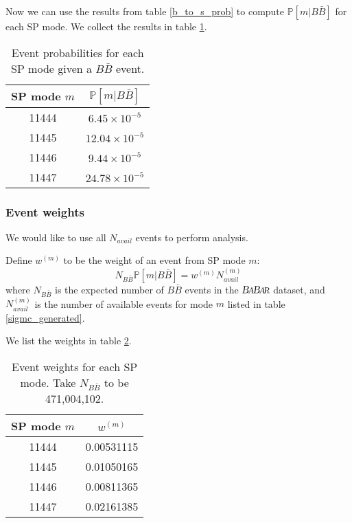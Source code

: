 \documentclass{article}
\newcommand{\CondP}[2]{\ensuremath{\mathbb{P}\left[#1|#2\right]}}
\renewcommand{\(}{\left(}
\renewcommand{\)}{\right)}
\numberwithin{equation}{section}
\begin{document}
Now we can use the results from table \ref{b_to_s_prob} to compute $\CondP{m}{B\bar{B}}$ for each SP mode. We collect the results in table \ref{spmode_prob}. 
\begin{table}[H]
  \begin{center}
    \begin{tabular}{ c c }
      SP mode $m$ & $\CondP{m}{B\bar{B}}$ \\
      \hline\hline
      11444 & $6.45\times 10^{-5}$ \\
      \hline
      11445 & $12.04\times 10^{-5}$ \\
      \hline
      11446 & $9.44\times 10^{-5}$ \\
      \hline
      11447 & $24.78\times 10^{-5}$ \\
      \hline
    \end{tabular}
  \end{center}
  \caption{Event probabilities for each SP mode given a $B\bar{B}$ event.}
  \label{spmode_prob}
\end{table}

\subsubsection{Event weights}
We would like to use all $N_{avail}$ events to perform analysis. 

Define $w^{(m)}$ to be the weight of an event from SP mode $m$:
\begin{equation}
  N_{B\bar{B}}\CondP{m}{B\bar{B}}=w^{(m)} N^{(m)}_{avail}
\end{equation}
where $N_{B\bar{B}}$ is the expected number of $B\bar{B}$ events in the $\babar$ dataset, and $N^{(m)}_{avail}$ is the number of available events for mode $m$ listed in table \ref{sigmc_generated}. 

We list the weights in table \ref{sigmc_weights}.
\begin{table}[H]
  \begin{center}
    \begin{tabular}{ c c }
      SP mode $m$ & $w^{(m)}$ \\
      \hline\hline
      11444 & 0.00531115 \\ 
      \hline
      11445 & 0.01050165 \\
      \hline
      11446 & 0.00811365 \\
      \hline
      11447 & 0.02161385 \\
      \hline
    \end{tabular}
  \end{center}
  \caption{Event weights for each SP mode. Take $N_{B\bar{B}}$ to be 471,004,102.}
  \label{sigmc_weights}
\end{table}
\end{document}
